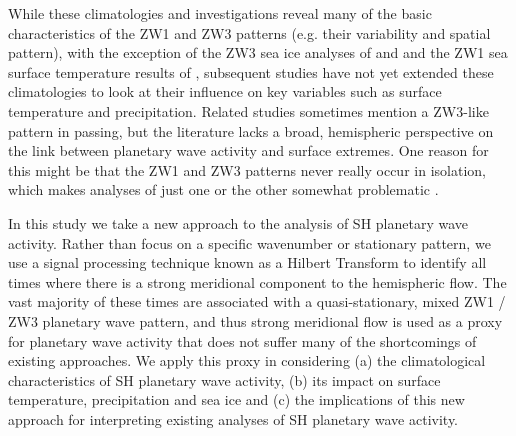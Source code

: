 While these climatologies and investigations reveal many of the basic characteristics of the ZW1 and ZW3 patterns (e.g. their variability and spatial pattern), with the exception of the ZW3 sea ice analyses of \citet{Raphael2007} and \citet{Yuan2008} and the ZW1 sea surface temperature results of \citet{Hobbs2007}, subsequent studies have not yet extended these climatologies to look at their influence on key variables such as surface temperature and precipitation. Related studies \citep[e.g. of Australian rainfall variability;][]{Frederiksen2014} sometimes mention a ZW3-like pattern in passing, but the literature lacks a broad, hemispheric perspective on the link between planetary wave activity and surface extremes. One reason for this might be that the ZW1 and ZW3 patterns never really occur in isolation, which makes analyses of just one or the other somewhat problematic \citep{Hobbs2010}.

In this study we take a new approach to the analysis of SH planetary wave activity. Rather than focus on a specific wavenumber or stationary pattern, we use a signal processing technique known as a Hilbert Transform to identify all times where there is a strong meridional component to the hemispheric flow. The vast majority of these times are associated with a quasi-stationary, mixed ZW1 / ZW3 planetary wave pattern, and thus strong meridional flow is used as a proxy for planetary wave activity that does not suffer many of the shortcomings of existing approaches. We apply this proxy in considering (a) the climatological characteristics of SH planetary wave activity, (b) its impact on surface temperature, precipitation and sea ice and (c) the implications of this new approach for interpreting existing analyses of SH planetary wave activity.